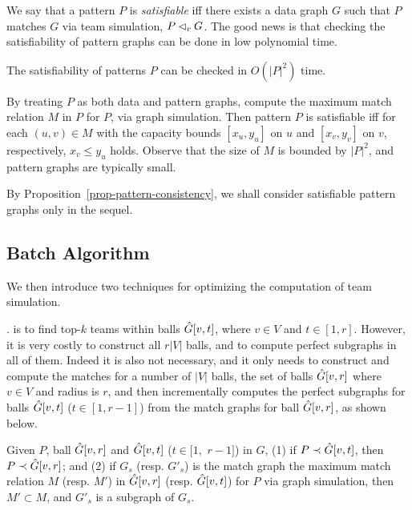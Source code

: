 
We say that a pattern $P$ is {\em satisfiable} iff there exists a data graph $G$ such that $P$ matches $G$ via team simulation, \ie $P \lhd_r G$.
The good news is that checking the satisfiability of pattern graphs can be done in low polynomial time.

\begin{prop}
\label{prop-pattern-consistency}
The satisfiability of patterns $P$ can be checked in $O(|P|^2)$ time.
\end{prop}

By treating $P$ as both data and pattern graphs, compute the maximum match relation $M$ in $P$ for $P$, via graph simulation.
Then pattern $P$ is satisfiable iff for each $(u, v)\in M$ with the capacity bounds $[x_u, y_u]$ on $u$ and $[x_v, y_v]$ on $v$, respectively, $x_v \leq y_u$ holds. Observe that the size of $M$ is bounded by $|P|^2$, and pattern graphs are typically small.

By Proposition~\ref{prop-pattern-consistency}, we shall consider  satisfiable pattern graphs only  in the sequel.



\subsection{Batch Algorithm}

We then introduce two techniques for optimizing the computation of team simulation.

. \teamF{} is to find top-$k$ teams within balls $\hat{G}{[v, t]}$, where $v \in V$ and $t \in [1,r]$.
However, it is very costly to construct all $r|V|$ balls, and to compute perfect subgraphs in all of them.
Indeed it is also not necessary, and it only needs to construct and compute the matches for a number of $|V|$ balls, \ie the set of balls $\hat{G}{[v, r]}$
where $v \in V$ and radius is $r$, and then incrementally computes the perfect subgraphs for balls $\hat{G}{[v, t]}$ ($t \in [1,r-1]$) from the match graphs for ball $\hat{G}{[v, r]}$, as shown below.

\vspace{-1ex}
\begin{theorem}
	\label{thm-tsim-radius}
	Given $P$, ball $\hat{G}{[v, r]}$ and $\hat{G}{[v, t]}$ ($t \in[1,$ $r-1]$) in $G$,
	(1) if $P\prec \hat{G}{[v, t]}$, then $P\prec \hat{G}{[v, r]}$; and
	(2) if $G_s$ (resp. $G'_s$) is the match graph \wrt the maximum match relation $M$ (resp. $M'$) in $\hat{G}{[v, r]}$ (resp. $\hat{G}{[v, t]}$) for $P$ via graph simulation, then $M' \subset M$, and $G'_s$ is a subgraph of $G_s$.	
\end{theorem}

